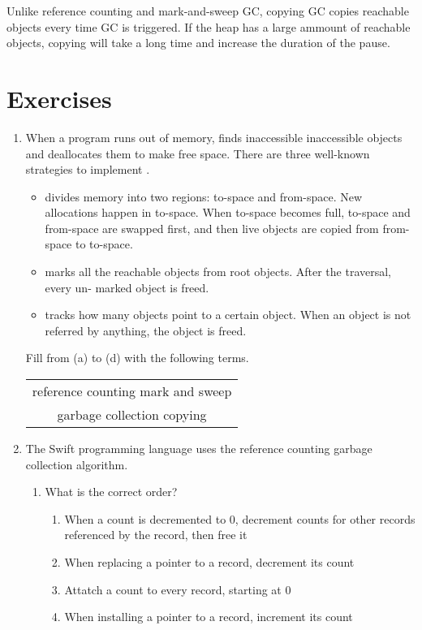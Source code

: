 Unlike reference counting and mark-and-sweep GC, copying GC copies reachable
objects every time GC is triggered. If the heap has a large ammount of reachable
objects, copying will take a long time and increase the duration of the pause.

\section{Exercises}

\begin{enumerate}
\item
 When a program runs out of memory,
     finds inaccessible inaccessible objects and deallocates
    them to make free space. There are three well-known strategies to
    implement .
\begin{itemize}
\item {} divides memory into two regions: to-space and
  from-space. New allocations happen in to-space. When to-space
  becomes full, to-space and from-space are swapped first, and then
  live objects are copied from from-space to to-space.
\item {} marks all the reachable objects from root
  objects. After the traversal, every un- marked object is freed.
\item {} tracks how many objects point to a certain
  object. When an object is not referred by anything, the object is freed.
\end{itemize}

Fill from (a) to (d) with the following terms.

\begin{center}
\begin{tabular}{|c|}
  \hline
  reference counting \qquad mark and sweep \\[6pt]
  garbage collection \qquad copying \\ \hline
\end{tabular}
\end{center}

\item
 The Swift programming language uses the reference counting garbage collection algorithm.

\begin{enumerate}
  \item
What is the correct order?

\begin{enumerate}
\item When a count is decremented to 0, decrement counts for other records referenced by the record, then free it
\item When replacing a pointer to a record, decrement its count
\item Attatch a count to every record, starting at 0
\item When installing a pointer to a record, increment its count
\end{enumerate}


\end{enumerate}
\end{enumerate}
